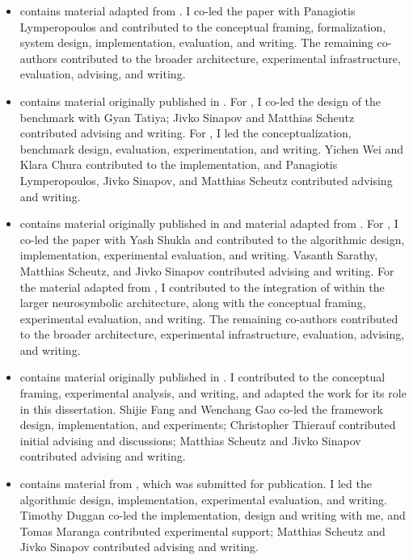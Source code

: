 \begin{itemize}
    \item {} contains material adapted from \citep{goel2024neurosymbolic}. I co-led the paper with Panagiotis Lymperopoulos and contributed to the conceptual framing, formalization, system design, implementation, evaluation, and writing. The remaining co-authors contributed to the broader architecture, experimental infrastructure, evaluation, advising, and writing.

    \item {} contains material originally published in \citep{goel2021novelgridworlds,goel2024novelgym}. For \citep{goel2021novelgridworlds}, I co-led the design of the benchmark with Gyan Tatiya; Jivko Sinapov and Matthias Scheutz contributed advising and writing. For \citep{goel2024novelgym}, I led the conceptualization, benchmark design, evaluation, experimentation, and writing. Yichen Wei and Klara Chura contributed to the implementation, and Panagiotis Lymperopoulos, Jivko Sinapov, and Matthias Scheutz contributed advising and writing.

    \item {} contains material originally published in \citep{goel2022rapidlearn} and material adapted from \citep{goel2024neurosymbolic}. For \citep{goel2022rapidlearn}, I co-led the paper with Yash Shukla and contributed to the algorithmic design, implementation, experimental evaluation, and writing. Vasanth Sarathy, Matthias Scheutz, and Jivko Sinapov contributed advising and writing. For the material adapted from \citep{goel2024neurosymbolic}, I contributed to the integration of \RAPidLearn{} within the larger neurosymbolic architecture, along with the conceptual framing, experimental evaluation, and writing. The remaining co-authors contributed to the broader architecture, experimental infrastructure, evaluation, advising, and writing.

    \item {} contains material originally published in \citep{fang2025flex}. I contributed to the conceptual framing, experimental analysis, and writing, and adapted the work for its role in this dissertation. Shijie Fang and Wenchang Gao co-led the framework design, implementation, and experiments; Christopher Thierauf contributed initial advising and discussions; Matthias Scheutz and Jivko Sinapov contributed advising and writing.

    \item {} contains material from \citep{goel2025pho}, which was submitted for publication. I led the algorithmic design, implementation, experimental evaluation, and writing. Timothy Duggan co-led the implementation, design and writing with me, and Tomas Maranga contributed experimental support; Matthias Scheutz and Jivko Sinapov contributed advising and writing.
\end{itemize}

